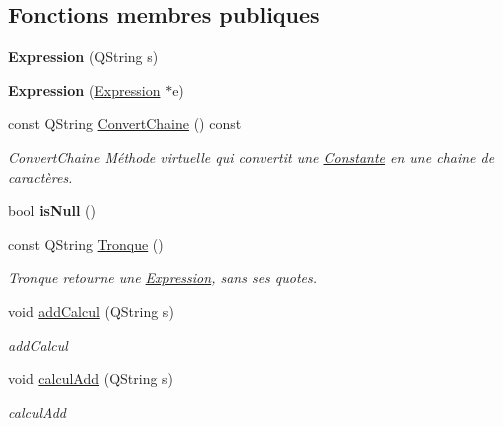 \subsection*{Fonctions membres publiques}
\begin{DoxyCompactItemize}
\item 
\hypertarget{class_calcul_1_1_expression_a756dc07653593481c4643d6a179d239b}{{\bfseries Expression} (Q\-String s)}\label{class_calcul_1_1_expression_a756dc07653593481c4643d6a179d239b}

\item 
\hypertarget{class_calcul_1_1_expression_a28a8ce64db734d8716f120b284a7e6df}{{\bfseries Expression} (\hyperlink{class_calcul_1_1_expression}{Expression} $\ast$e)}\label{class_calcul_1_1_expression_a28a8ce64db734d8716f120b284a7e6df}

\item 
const Q\-String \hyperlink{class_calcul_1_1_expression_a8bffbb504f9348cd69790c0fe23bf67d}{Convert\-Chaine} () const 
\begin{DoxyCompactList}\small\item\em Convert\-Chaine Méthode virtuelle qui convertit une \hyperlink{class_calcul_1_1_constante}{Constante} en une chaine de caractères. \end{DoxyCompactList}\item 
\hypertarget{class_calcul_1_1_expression_a240d6f19b3c3f3f5eebe3bddaa83f306}{bool {\bfseries is\-Null} ()}\label{class_calcul_1_1_expression_a240d6f19b3c3f3f5eebe3bddaa83f306}

\item 
\hypertarget{class_calcul_1_1_expression_af70b11f7b8fb7fc792df5628b932a117}{const Q\-String \hyperlink{class_calcul_1_1_expression_af70b11f7b8fb7fc792df5628b932a117}{Tronque} ()}\label{class_calcul_1_1_expression_af70b11f7b8fb7fc792df5628b932a117}

\begin{DoxyCompactList}\small\item\em Tronque retourne une \hyperlink{class_calcul_1_1_expression}{Expression}, sans ses quotes. \end{DoxyCompactList}\item 
void \hyperlink{class_calcul_1_1_expression_ac093ea5837a113f64be91e66b055b18b}{add\-Calcul} (Q\-String s)
\begin{DoxyCompactList}\small\item\em add\-Calcul \end{DoxyCompactList}\item 
void \hyperlink{class_calcul_1_1_expression_a0e762d07570ac388d0919a4c2053eecd}{calcul\-Add} (Q\-String s)
\begin{DoxyCompactList}\small\item\em calcul\-Add \end{DoxyCompactList}\end{DoxyCompactItemize}
